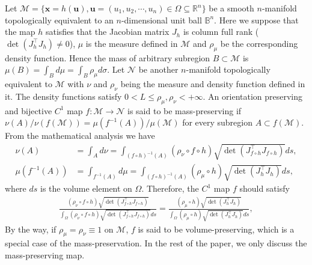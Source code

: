 \documentclass{article}
\begin{document}
Let $\mathcal{M} = \{\mathbf{x} = h(\mathbf{u}), \mathbf{u} = (u_1,u_2,\cdots,u_n) \in \Omega \subseteq \mathbb{R}^n\}$ be a smooth $n$-manifold topologically equivalent to an $n$-dimensional unit ball $\mathbb{B}^n$. Here we suppose that
the map $h$ satisfies that the Jacobian matrix $J_h$ is column full rank ($\det(J_h^\top J_h) \neq 0$), $\mu$ is the measure defined in $\mathcal{M}$ and $\rho_\mu$ be the corresponding density function.
Hence the mass of arbitrary subregion $B \subset \mathcal{M}$ is $\mu(B) = \int_B d\mu = \int_B \rho_\mu d\sigma$.
Let $\mathcal{N}$ be another $n$-manifold topologically equivalent to $\mathcal{M}$ with $\nu$ and $\rho_\nu$ being the measure and density function defined in it. The density functions satisfy $0< L \leq \rho_\mu, \rho_\nu < +\infty$.
An orientation preserving and bijective $C^1$ map $f:\mathcal{M} \to \mathcal{N}$ is said to be mass-preserving if
$\nu(A)/\nu(f(\mathcal{M})) = \mu(f^{-1}(A))/\mu(\mathcal{M})$
for every subregion $A \subset f(\mathcal{M})$. From the mathematical analysis we have
\begin{align}
    \nu(A) &= \int_A d\nu = \int_{(f\circ h)^{-1} (A)} (\rho_\nu \circ f \circ h) \sqrt{\det(J_{f\circ h}^\top J_{f\circ h})} ds,\\
    \mu(f^{-1}(A)) &= \int_{f^{-1} (A)} d\mu = \int_{(f\circ h)^{-1} (A)} (\rho_\mu \circ h) \sqrt{\det(J_{h}^\top J_{h})} ds,
\end{align}
where $ds$ is the volume element on $\Omega$. Therefore, the $C^1$ map $f$ should satisfy
\begin{align} \label{eq:masspres}
    \frac{(\rho_\nu \circ f \circ h) \sqrt{\det(J_{f\circ h}^\top J_{f\circ h})}}{\int_\Omega (\rho_\nu \circ f \circ h) \sqrt{\det(J_{f\circ h}^\top J_{f\circ h})} ds}
    = \frac{(\rho_\mu \circ h)\sqrt{\det(J_{h}^\top J_{h})}}{\int_\Omega (\rho_\mu \circ h)\sqrt{\det(J_{h}^\top J_{h})} ds},
\end{align}
By the way, if $\rho_\mu = \rho_\nu \equiv 1$ on $\mathcal{M}$, $f$ is said to be volume-preserving, which is a special case of the mass-preservation. In the rest of the paper, we only discuss the mass-preserving map.
\end{document}
